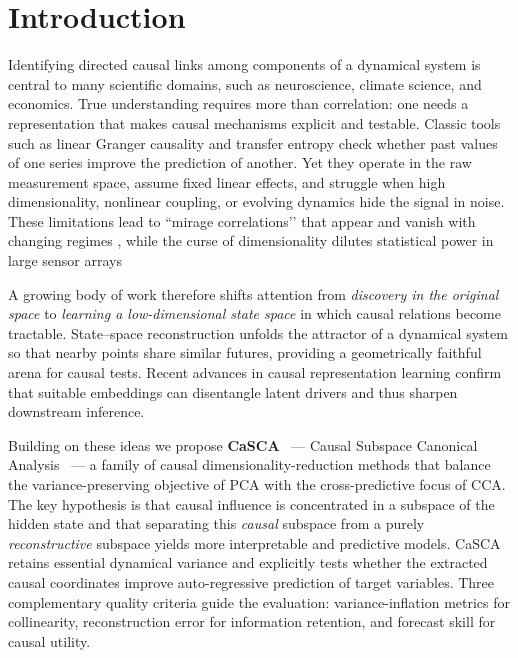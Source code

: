 \documentclass[14pt]{extarticle}
\begin{document}
	\newpage
	
	\section{Introduction}
	
	Identifying directed causal links among components of a dynamical system is central to many scientific domains, such as neuroscience, climate science, and economics.
	True understanding requires more than correlation: one needs a representation that makes causal mechanisms explicit and testable.  
	Classic tools such as linear Granger causality \citep{Granger1969} and transfer entropy \citep{Schreiber2000} check whether past values of one series improve the prediction of another.  
	Yet they operate in the raw measurement space, assume fixed linear effects, and struggle when high dimensionality, nonlinear coupling, or evolving dynamics hide the signal in noise.  
	These limitations lead to ``mirage correlations’’ that appear and vanish with changing regimes \citep{Sugihara2012}, while the curse of dimensionality dilutes statistical power in large sensor arrays \citep{Runge2019}
	
	A growing body of work therefore shifts attention from \emph{discovery in the original space} to \emph{learning a low-dimensional state space} in which causal relations become tractable.  
	State–space reconstruction unfolds the attractor of a dynamical system so that nearby points share similar futures, providing a geometrically faithful arena for causal tests.  
	Recent advances in causal representation learning \citep{Scholkopf2021} confirm that suitable embeddings can disentangle latent drivers and thus sharpen downstream inference.  
	
	Building on these ideas we propose \textbf{CaSCA} ~--- Causal Subspace Canonical Analysis ~--- a family of causal dimensionality-reduction methods that balance the variance-preserving objective of PCA with the cross-predictive focus of CCA.  
	The key hypothesis is that causal influence is concentrated in a subspace of the hidden state and that separating this \emph{causal} subspace from a purely \emph{reconstructive} subspace yields more interpretable and predictive models.  
	CaSCA retains essential dynamical variance and explicitly tests whether the extracted causal coordinates improve auto-regressive prediction of target variables.  
	Three complementary quality criteria guide the evaluation: variance-inflation metrics for collinearity, reconstruction error for information retention, and forecast skill for causal utility.  
	
\end{document}
